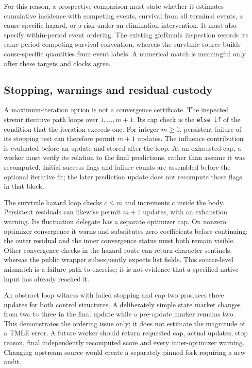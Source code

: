 For this reason, a prospective comparison must state whether it estimates
cumulative incidence with competing events, survival from all terminal
events, a cause-specific hazard, or a risk under an elimination intervention.
It must also specify within-period event ordering. The existing gfoRmula
inspection records its same-period competing-survival convention, whereas
the survtmle source builds cause-specific quantities from event labels.
A numerical match is meaningful only after these targets and clocks agree.
\citep{exec20_gformula_reuse,exec23_longr_survtmle}

\subsection{Stopping, warnings and residual custody}
A maximum-iteration option is not a convergence certificate. The inspected
stremr iterative path loops over $1,\ldots,m+1$. Its cap check is the
\texttt{else if} of the condition that the iteration exceeds one. For integer
$m\geq1$, persistent failure of its stopping test can therefore permit
$m+1$ updates. The influence contribution is evaluated before an update and
stored after the loop. At an exhausted cap, a worker must verify its relation
to the final predictions, rather than assume it was recomputed. Initial
success flags and failure counts are assembled before the optional iterative
fit; the later prediction update does not recompute those flags in that block.
\citep{exec23_longr_stremr}

The survtmle hazard loop checks $c\leq m$ and increments $c$ inside the body.
Persistent residuals can likewise permit $m+1$ updates, with an exhaustion
warning. Its fluctuation delegate has a separate optimizer cap. On nonzero
optimizer convergence it warns and substitutes zero coefficients before
continuing; the outer residual and the inner convergence status must both
remain visible. Other convergence checks in the hazard route can return
character sentinels, whereas the public wrapper subsequently expects list
fields. This source-level mismatch is a failure path to exercise; it is not
evidence that a specified native input has already reached it.
\citep{exec23_longr_survtmle}

An abstract loop witness with failed stopping and cap two produces three
updates for both control structures. A deliberately simple state marker
changes from two to three in the final update while a pre-update marker
remains two. This demonstrates the ordering issue only; it does not estimate
the magnitude of a TMLE error. A future worker should return requested cap,
actual updates, stop reason, final independently recomputed score and every
inner-optimizer warning. Changing upstream source would create a separately
pinned fork requiring a new audit. \citep{exec23_longr_reference}

